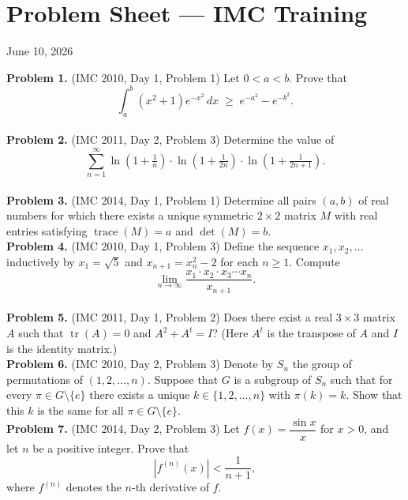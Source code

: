 \documentclass{article}
\begin{document}
\pagestyle{plain}

\section*{Problem Sheet --- IMC Training}

\begin{center}
June 10, 2026
\end{center}

\textbf{Problem 1.} (IMC 2010, Day 1, Problem 1)
Let \( 0 < a < b \). Prove that
\[
\int_a^b (x^2 + 1) e^{-x^2}\, dx \;\geq\; e^{-a^2} - e^{-b^2}.
\]
\\

\textbf{Problem 2.} (IMC 2011, Day 2, Problem 3)
Determine the value of
\[
\sum_{n=1}^{\infty} \ln\!\left(1 + \tfrac{1}{n}\right) \cdot \ln\!\left(1 + \tfrac{1}{2n}\right) \cdot \ln\!\left(1 + \tfrac{1}{2n+1}\right).
\]
\\

\textbf{Problem 3.} (IMC 2014, Day 1, Problem 1)
Determine all pairs \( (a, b) \) of real numbers for which there exists a unique symmetric \( 2 \times 2 \) matrix \( M \) with real entries satisfying \( \operatorname{trace}(M) = a \) and \( \det(M) = b \).
\\

\textbf{Problem 4.} (IMC 2010, Day 1, Problem 3)
Define the sequence \( x_1, x_2, \ldots \) inductively by \( x_1 = \sqrt{5} \) and \( x_{n+1} = x_n^2 - 2 \) for each \( n \geq 1 \). Compute
\[
\lim_{n \to \infty} \frac{x_1 \cdot x_2 \cdot x_3 \cdots x_n}{x_{n+1}}.
\]
\\

\textbf{Problem 5.} (IMC 2011, Day 1, Problem 2)
Does there exist a real \( 3 \times 3 \) matrix \( A \) such that \( \operatorname{tr}(A) = 0 \) and \( A^2 + A^t = I \)?
(Here \( A^t \) is the transpose of \( A \) and \( I \) is the identity matrix.)
\\

\textbf{Problem 6.} (IMC 2010, Day 2, Problem 3)
Denote by \( S_n \) the group of permutations of \( (1, 2, \ldots, n) \). Suppose that \( G \) is a subgroup of \( S_n \) such that for every \( \pi \in G \setminus \{e\} \) there exists a unique \( k \in \{1, 2, \ldots, n\} \) with \( \pi(k) = k \). Show that this \( k \) is the same for all \( \pi \in G \setminus \{e\} \).
\\

\textbf{Problem 7.} (IMC 2014, Day 2, Problem 3)
Let \( f(x) = \dfrac{\sin x}{x} \) for \( x > 0 \), and let \( n \) be a positive integer. Prove that
\[
\left| f^{(n)}(x) \right| < \frac{1}{n+1},
\]
where \( f^{(n)} \) denotes the \( n \)-th derivative of \( f \).
\\
\end{document}
